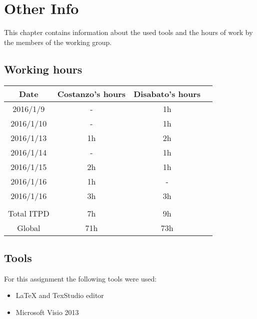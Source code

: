 \documentclass[\mainpath/main]{subfiles}
\begin{document}
\chapter{Other Info}
\label{OtherInfo}

\setmyfancystyle

This chapter contains information about the used tools and the hours of work by the members of the working group.

\section{Working hours}
\begin{table}[h!]
	\centering
\begin{tabular}{cccc}
\hline
Date     	& Costanzo's hours & Disabato's hours  & \\ \hline
2016/1/9 	& -			  	   & 1h 			   & \\ \hline
2016/1/10	& - 		  	   & 1h 			   & \\ \hline
2016/1/13	& 1h 		  	   & 2h 			   & \\ \hline
2016/1/14 	& - 		  	   & 1h 			   & \\ \hline
2016/1/15 	& 2h 		 	   & 1h 			   & \\ \hline
2016/1/16 	& 1h 		 	   & -	 			   & \\ \hline
2016/1/16 	& 3h 		 	   & 3h	 			   & \\ \hline
\\
Total ITPD  & 7h 		 	   & 9h 			   & \\ \hline
Global 	    & 71h 		 	   & 73h 			   & \\ \hline

\end{tabular}
\end{table}

\clearpage

\section{Tools}
For this assignment the following tools were used:
\begin{itemize}
	\item \LaTeX{} and TexStudio editor
	\item Microsoft Visio 2013
\end{itemize}
\end{document}
